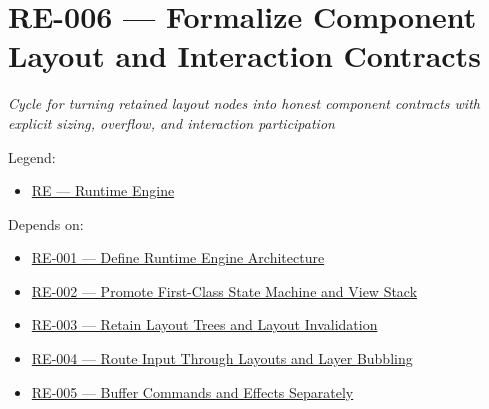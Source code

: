\chapter{RE-006 --- Formalize Component Layout and Interaction Contracts}\label{record-154}

\smallskip

\emph{Cycle for turning retained layout nodes into honest component contracts with explicit sizing, overflow, and interaction participation}

Legend:

\begin{itemize}
\tightlist
\item
  \href{https://github.com/flyingrobots/bijou/blob/1853ad902f6bf219326409e7f743a5a1d6517dbc/docs/legends/RE-runtime-engine.md}{RE --- Runtime Engine}
\end{itemize}

Depends on:

\begin{itemize}
\tightlist
\item
  \href{https://github.com/flyingrobots/bijou/blob/cbd70612140e7a450d764b3c7be1c6af878b99bc/docs/design/RE-001-define-runtime-engine-architecture.md}{RE-001 --- Define Runtime Engine Architecture}
\item
  \href{https://github.com/flyingrobots/bijou/blob/cbd70612140e7a450d764b3c7be1c6af878b99bc/docs/design/RE-002-promote-first-class-state-machine-and-view-stack.md}{RE-002 --- Promote First-Class State Machine and View Stack}
\item
  \href{https://github.com/flyingrobots/bijou/blob/cbd70612140e7a450d764b3c7be1c6af878b99bc/docs/design/RE-003-retain-layout-trees-and-layout-invalidation.md}{RE-003 --- Retain Layout Trees and Layout Invalidation}
\item
  \href{https://github.com/flyingrobots/bijou/blob/cbd70612140e7a450d764b3c7be1c6af878b99bc/docs/design/RE-004-route-input-through-layouts-and-layer-bubbling.md}{RE-004 --- Route Input Through Layouts and Layer Bubbling}
\item
  \href{https://github.com/flyingrobots/bijou/blob/cbd70612140e7a450d764b3c7be1c6af878b99bc/docs/design/RE-005-buffer-commands-and-effects-separately.md}{RE-005 --- Buffer Commands and Effects Separately}
\end{itemize}

